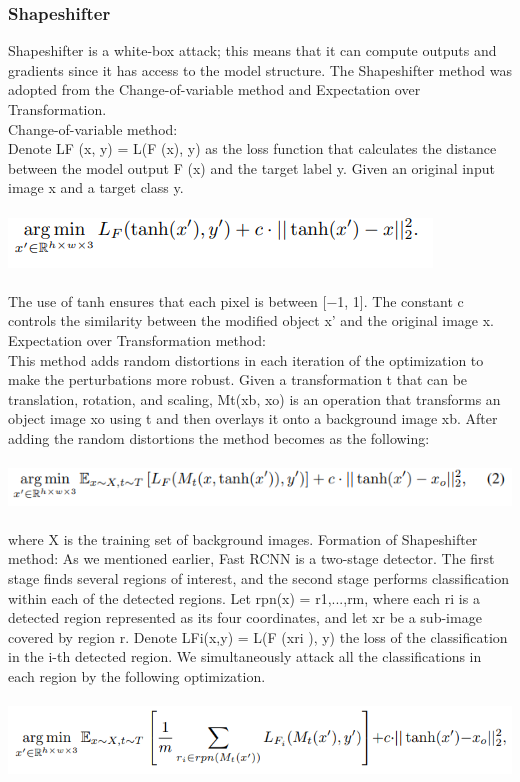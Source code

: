 \documentclass[sigconf, nonacm]{acmart}
\begin{document}
\subsubsection{ Shapeshifter }

Shapeshifter is a white-box attack; this means that it can compute outputs and gradients since it has access to the model structure.\cite{Abril07} The Shapeshifter method was adopted from the Change-of-variable method and Expectation over Transformation. 
\\Change-of-variable method: 
\\Denote LF (x, y) = L(F (x), y) as the loss function that calculates the distance between the model output F (x) and the target label y. Given an original input image x and a target class y.
\\
\\
\includegraphics[scale=0.60]{file9.png}
\\
\\
The use of tanh ensures that each pixel is between [−1, 1]. The constant c controls the similarity between the modified object x' and the original image x.
\\Expectation over Transformation method: 
\\This method adds random distortions in each iteration of the optimization to make the perturbations more robust. Given a transformation t that can be translation, rotation, and scaling, Mt(xb, xo) is an operation that transforms an object image xo using t and then overlays it onto a background image xb. After adding the random distortions the method becomes as the following: 
\\
\\
\includegraphics[scale=0.60]{file8.png}
\\
\\
where X is the training set of background images. 
Formation of Shapeshifter method: 
As we mentioned earlier, Fast RCNN is a two-stage detector. The first stage finds several regions of interest, and the second stage performs classification within each of the detected regions. Let rpn(x) = {r1,...,rm}, where each ri is a detected region represented as its four coordinates, and let xr be a sub-image covered by region r. Denote LFi(x,y) = L(F (xri ), y) the loss of the classification in the i-th detected region. We simultaneously attack all the classifications in each region by the following optimization.\cite{Abril07}
\\
\\
\includegraphics[scale=0.40]{file11.png}
\\
  
\end{document}
